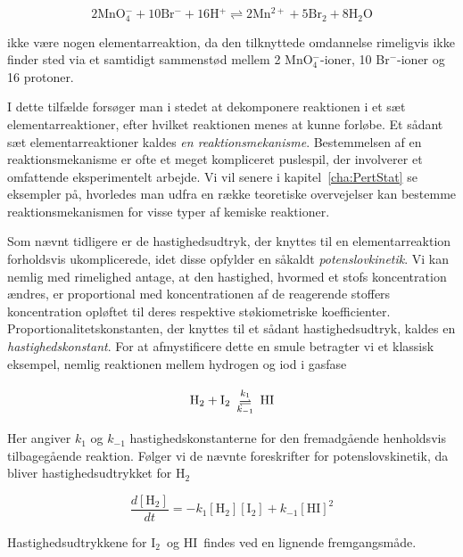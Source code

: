 {
\newcommand{\ho}        {\mbox{H$_2$O}}
\newcommand{\permn}     {\mbox{MnO$^-_4$}}
\newcommand{\mn}        {\mbox{Mn$^{2+}$}}
\newcommand{\bromid}    {\mbox{Br$^-$}}
\newcommand{\brom}      {\mbox{Br$_2$}}
\newcommand{\prot}      {\mbox{H$^+$}}
\begin{equation}
 2 \permn + 10 \bromid + 16 \prot \rightleftharpoons 
 2 \mn    + 5  \brom + 8 \ho
\end{equation}

ikke v{\ae}re nogen elementarreaktion, da den tilknyttede
omdannelse rimeligvis ikke finder sted via et samtidigt
sammenst{\o}d mellem 2 \permn-ioner, 10 \bromid-ioner og 16
protoner.} I dette tilf{\ae}lde fors{\o}ger man i stedet at
dekomponere reaktionen i et s{\ae}t elementarreaktioner,
efter hvilket reaktionen menes at kunne forl{\o}be. Et
s{\aa}dant s{\ae}t elementarreaktioner kaldes {\em en
reaktions\-meka\-nis\-me\/}. Bestemmelsen af en
reaktions\-mekanisme er ofte et meget kompliceret
puslespil, der involverer et omfattende eksperimentelt
arbejde. Vi vil senere i kapitel~\ref{cha:PertStat} se
eksempler p{\aa}, hvorledes man udfra en r{\ae}kke
teoretiske overvejelser kan bestemme reaktions\-mekanismen
for visse typer af kemiske reaktioner.

\vspace{4.0mm}
{
\newcommand{\brint}     {\mbox{H$_2$}}
\newcommand{\iod}       {\mbox{I$_2$}}
\newcommand{\hi}        {\mbox{HI}}
\newcommand{\reactionarrow}[2]
{\begin{array}{c}
  \mbox{\scriptsize $#1$} \\[-1.5mm]
  \rightleftharpoons      \\[-2.5mm]
  \mbox{\scriptsize $#2$} 
\end{array}}

Som n{\ae}vnt tidligere er de hastigheds\-udtryk, der
knyttes til en elementarreaktion forholdsvis ukomplicerede,
idet disse opfylder en s{\aa}kaldt {\em
potenslov\-kinetik\/}. Vi kan nemlig med rimelighed antage,
at den hastighed, hvormed et stofs koncentration
{\ae}ndres, er proportional med koncentrationen af de
reagerende stoffers koncentration opl{\o}ftet til deres
respektive st{\o}kiometriske koeffi\-cienter.
Proportionalitetskonstanten, der knyttes til et s{\aa}dant
hastig\-heds\-udtryk, kaldes en {\em
hastig\-heds\-konstant\/}. For at afmystificere dette en
smule betragter vi et klassisk eksempel, nemlig reaktionen
mellem hydrogen og iod i gasfase~\cite{KAJensen}

\begin{equation}
  \brint + \iod \reactionarrow{k_1}{k_{-1}} \hi
\end{equation}

Her angiver $k_1$ og $k_{-1}$ hastigheds\-konstanterne for
den fremadg{\aa}ende henholds\-vis tilbageg{\aa}ende
reaktion. F{\o}lger vi de n{\ae}vnte foreskrifter for
potenslovs\-kinetik, da bliver hastigheds\-udtrykket for
\brint

\begin{equation}
  \frac{d[\brint]}{dt} = -k_1 [\brint][\iod] + k_{-1}[\hi]^2
\end{equation}

Hastighedsudtrykkene for \iod~og \hi~findes ved en
lignende fremgangsm{\aa}de. 
}

